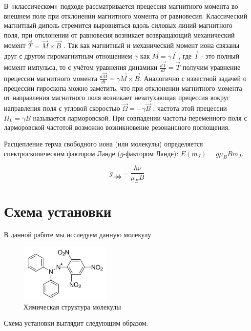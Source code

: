 \documentclass[a4paper, 12pt]{article}%
\begin{document}
В «классическом» подходе рассматривается прецессия магнитного момента во внешнем поле
при отклонении магнитного момента от равновесия. Классический магнитный диполь
стремится выровняться вдоль силовых линий магнитного поля, при отклонении от
равновесия возникает возвращающий механический момент $\vec{T}=\vec{M}\times \vec{B}$ . Так как
магнитный и механический момент иона связаны друг с другом гиромагнитным отношением
$\gamma$ как $\vec{M} =\gamma \vec{I}$ , где $\vec{I}$ - это полный момент импульса, то с учётом уравнения динамики $\frac{d\vec{I}}{dt} = \vec{T}$ получим уравнение прецессии магнитного момента $\frac{d\vec{M}}{dt} = \gamma \vec{M}\times \vec{B}$. Аналогично
с известной задачей о прецессии гироскопа можно заметить, что при отклонении магнитного
момента от направления магнитного поля возникает незатухающая прецессия вокруг
направления поля с угловой скоростью $\vec{\Omega}= - \gamma \vec{B}$ , частота этой прецессии $\Omega_L=\gamma B$
называется ларморовской. При совпадении частоты переменного поля с ларморовской
частотой возможно возникновение резонансного поглощения.

Расщепление терма свободного иона (или молекулы) определяется спектроскопическим
фактором Ланде ($g$-фактором Ланде): $E(m_J)=g\mu_B B m_J$.

\begin{equation}
g_{\text{эфф}} = \frac{h \nu}{\mu_B B}
\end{equation}
\newpage
\section*{Схема установки}
В данной работе мы исследуем данную молекулу

\begin{figure}[h]
\begin{center}
\includegraphics[width = 0.4\textwidth]{2.jpg}
\caption{Химическая структура молекулы}
\end{center}
\end{figure}

Схема установки выглядит следующим образом:
\end{document}

